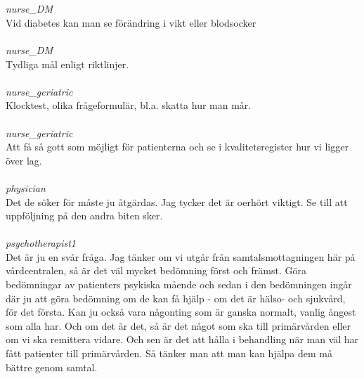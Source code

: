 \documentclass[12pt,a4paper,oneside]{article}
\begin{document}
\ \\\ \\
 { \it   nurse\_DM %
}\\
Vid diabetes kan man se f{\"o}r{\"a}ndring i vikt eller blodsocker %
\ \\\ \\
 { \it   nurse\_DM %
}\\
Tydliga m{\aa}l enligt riktlinjer. %
\ \\\ \\
 { \it   nurse\_geriatric %
}\\
Klocktest, olika fr{\aa}geformul{\"a}r, bl.a. skatta hur man m{\aa}r. %
\ \\\ \\
 { \it   nurse\_geriatric %
}\\
Att f{\aa} s{\aa} gott som m{\"o}jligt f{\"o}r patienterna och se i kvalitetsregister hur vi ligger {\"o}ver lag. %
\ \\\ \\
 { \it   physician %
}\\
Det de s{\"o}ker f{\"o}r m{\aa}ste ju {\aa}tg{\"a}rdas. Jag tycker det {\"a}r oerh{\"o}rt viktigt. Se till att uppf{\"o}ljning p{\aa} den andra biten sker.  %
\ \\\ \\
 { \it   psychotherapist1 %
}\\
Det {\"a}r ju en sv{\aa}r fr{\aa}ga. Jag t{\"a}nker om vi utg{\aa}r fr{\aa}n samtalsmottagningen h{\"a}r p{\aa} v{\aa}rdcentralen, s{\aa} {\"a}r det v{\"a}l mycket bed{\"o}mning f{\"o}rst och fr{\"a}mst. G{\"o}ra bed{\"o}mningar av patienters psykiska m{\aa}ende och sedan i den bed{\"o}mningen ing{\aa}r d{\"a}r ju att g{\"o}ra bed{\"o}mning om de kan f{\aa} hj{\"a}lp - om det {\"a}r h{\"a}lso- och sjukv{\aa}rd, f{\"o}r det f{\"o}rsta. Kan ju ocks{\aa} vara n{\aa}gonting som {\"a}r ganska normalt, vanlig {\aa}ngest som alla har. Och om det {\"a}r det, s{\aa} {\"a}r det n{\aa}got som ska till prim{\"a}rv{\aa}rden eller om vi ska remittera vidare. Och sen {\"a}r det att h{\aa}lla i behandling n{\"a}r man v{\"a}l har f{\aa}tt patienter till prim{\"a}rv{\aa}rden. S{\aa} t{\"a}nker man att man kan hj{\"a}lpa dem m{\aa} b{\"a}ttre genom samtal. %
\end{document}
